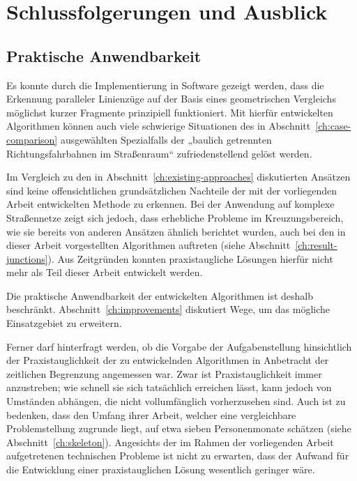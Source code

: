 \documentclass[../main/thesis.tex]{subfiles}
\begin{document}
\chapter{Schlussfolgerungen und Ausblick}

\section{Praktische Anwendbarkeit}

Es konnte durch die Implementierung in Software gezeigt werden, dass die Erkennung paralleler Linienzüge auf der Basis eines geometrischen Vergleichs möglichst kurzer Fragmente prinzipiell funktioniert.
Mit hierfür entwickelten Algorithmen können auch viele schwierige Situationen des in Abschnitt~\ref{ch:case-comparison} ausgewählten Spezialfalls der „baulich getrennten Richtungsfahrbahnen im Straßenraum“ zufriedenstellend gelöst werden.

Im Vergleich zu den in Abschnitt~\ref{ch:existing-approaches} diskutierten Ansätzen sind keine offensichtlichen grundsätzlichen Nachteile der mit der vorliegenden Arbeit entwickelten Methode zu erkennen.
Bei der Anwendung auf komplexe Straßennetze zeigt sich jedoch, dass erhebliche Probleme im Kreuzungsbereich, wie sie bereits von anderen Ansätzen ähnlich berichtet wurden, auch bei den in dieser Arbeit vorgestellten Algorithmen auftreten (siehe Abschnitt~\ref{ch:result-junctions}).
Aus Zeitgründen konnten praxistaugliche Lösungen hierfür nicht mehr als Teil dieser Arbeit entwickelt werden.

Die praktische Anwendbarkeit der entwickelten Algorithmen ist deshalb beschränkt.
Abschnitt~\ref{ch:improvements} diskutiert Wege, um das mögliche Einsatzgebiet zu erweitern.

Ferner darf hinterfragt werden, ob die Vorgabe der Aufgabenstellung hinsichtlich der Praxistauglichkeit der zu entwickelnden Algorithmen in Anbetracht der zeitlichen Begrenzung angemessen war.
Zwar ist Praxistauglichkeit immer anzustreben; wie schnell sie sich tatsächlich erreichen lässt, kann jedoch von Umständen abhängen, die nicht vollumfänglich vorherzusehen sind.
Auch ist zu bedenken, dass \citeauthor{LM96} den Umfang ihrer Arbeit, welcher eine vergleichbare Problemstellung zugrunde liegt, auf etwa sieben Personenmonate schätzen (siehe Abschnitt~\ref{ch:skeleton}). 
Angesichts der im Rahmen der vorliegenden Arbeit aufgetretenen technischen Probleme ist nicht zu erwarten, dass der Aufwand für die Entwicklung einer praxistauglichen Lösung wesentlich geringer wäre.
\end{document}
